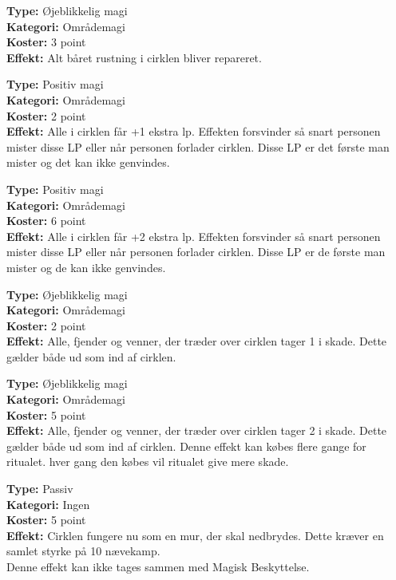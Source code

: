 \begin{ritual*}
\textbf{Type:} Øjeblikkelig magi\\
\textbf{Kategori:} Områdemagi\\
\textbf{Koster:} 3 point\\
\textbf{Effekt:} Alt båret rustning i cirklen bliver repareret.
\end{ritual*}

\begin{ritual*}
\textbf{Type:} Positiv magi\\
\textbf{Kategori:} Områdemagi\\
\textbf{Koster:} 2 point\\
\textbf{Effekt:} Alle i cirklen får +1 ekstra lp. Effekten forsvinder så snart personen mister disse LP eller når personen forlader cirklen. Disse LP er det første man mister og det kan ikke genvindes.
\end{ritual*}

\begin{ritual*}
\textbf{Type:} Positiv magi\\
\textbf{Kategori:} Områdemagi\\
\textbf{Koster:} 6 point\\
\textbf{Effekt:} Alle i cirklen får +2 ekstra lp. Effekten forsvinder så snart personen mister disse LP eller når personen forlader cirklen. Disse LP er de første man mister og de kan ikke genvindes.
\end{ritual*}

\begin{ritual*}
\textbf{Type:} Øjeblikkelig magi\\
\textbf{Kategori:} Områdemagi\\
\textbf{Koster:} 2 point\\
\textbf{Effekt:} Alle, fjender og venner, der træder over cirklen tager 1 i skade. Dette gælder både ud som ind af cirklen.
\end{ritual*}

\begin{ritual*}
\textbf{Type:} Øjeblikkelig magi\\
\textbf{Kategori:} Områdemagi\\
\textbf{Koster:} 5 point\\
\textbf{Effekt:} Alle, fjender og venner, der træder over cirklen tager 2 i skade. Dette gælder både ud som ind af cirklen. Denne effekt kan købes flere gange for ritualet. hver gang den købes vil ritualet give mere skade.
\end{ritual*}
\begin{ritual*}
\textbf{Type:} Passiv\\
\textbf{Kategori:} Ingen\\
\textbf{Koster:} 5 point\\
\textbf{Effekt:} Cirklen fungere nu som en mur, der skal nedbrydes. Dette kræver en samlet styrke på 10 nævekamp.\\
Denne effekt kan ikke tages sammen med Magisk Beskyttelse.
\end{ritual*}

